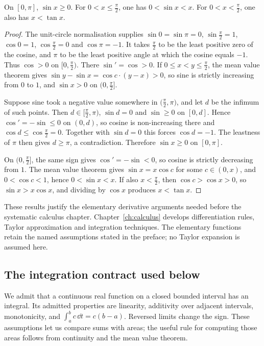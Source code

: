 \begin{proposition}\label{prop:sincmp}
On $[0,\pi]$, $\sin x\ge0$. For $0<x\le\frac\pi2$, one has $0<\sin x<x$. For $0<x<\frac\pi2$, one also has $x<\tan x$.
\end{proposition}
\begin{proof}
The unit-circle normalisation supplies $\sin0=\sin\pi=0$, $\sin\frac\pi2=1$, $\cos0=1$, $\cos\frac\pi2=0$ and $\cos\pi=-1$. It takes $\frac\pi2$ to be the least positive zero of the cosine, and $\pi$ to be the least positive angle at which the cosine equals $-1$. Thus $\cos>0$ on $\bigl[0,\frac\pi2\bigr)$. There $\sin'=\cos>0$. If $0\le x<y\le\frac\pi2$, the mean value theorem gives $\sin y-\sin x=\cos c\cdot(y-x)>0$, so sine is strictly increasing from $0$ to $1$, and $\sin x>0$ on $\bigl(0,\frac\pi2\bigr]$.

Suppose sine took a negative value somewhere in $\bigl(\frac\pi2,\pi\bigr)$, and let $d$ be the infimum of such points. Then $d\in\bigl[\frac\pi2,\pi\bigr)$, $\sin d=0$ and $\sin\ge0$ on $[0,d]$. Hence $\cos'=-\sin\le0$ on $(0,d)$, so cosine is non-increasing there and $\cos d\le\cos\frac\pi2=0$. Together with $\sin d=0$ this forces $\cos d=-1$. The leastness of $\pi$ then gives $d\ge\pi$, a contradiction. Therefore $\sin x\ge0$ on $[0,\pi]$.

On $\bigl(0,\frac\pi2\bigr]$, the same sign gives $\cos'=-\sin<0$, so cosine is strictly decreasing from $1$. The mean value theorem gives $\sin x=x\cos c$ for some $c\in(0,x)$, and $0<\cos c<1$, hence $0<\sin x<x$. If also $x<\frac\pi2$, then $\cos c>\cos x>0$, so $\sin x>x\cos x$, and dividing by $\cos x$ produces $x<\tan x$.
\end{proof}

These results justify the elementary derivative arguments needed before the systematic
calculus chapter. Chapter~\ref{ch:calculus} develops differentiation rules,
Taylor approximation and integration techniques. The elementary functions retain
the named assumptions stated in the preface; no Taylor expansion is assumed here.

\subsection*{The integration contract used below}
We admit that a continuous real function on a closed bounded interval has an
integral. Its admitted properties are linearity, additivity over adjacent
intervals, monotonicity, and $\int_a^b c\,\dd t=c(b-a)$. Reversed limits change
the sign. These assumptions let us compare sums with areas; the useful rule for
computing those areas follows from continuity and the mean value theorem.

